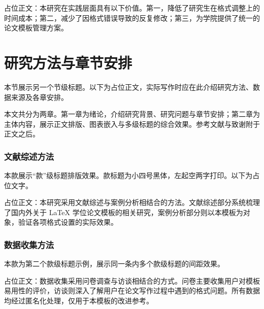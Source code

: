 占位正文：本研究在实践层面具有以下价值。第一，降低了研究生在格式调整上的时间成本；第二，减少了因格式错误导致的反复修改；第三，为学院提供了统一的论文模板管理方案。

\section{研究方法与章节安排}
本节展示另一个节级标题。以下为占位正文，实际写作时应在此介绍研究方法、数据来源及各章安排。

本文共分为两章。第一章为绪论，介绍研究背景、研究问题与章节安排；第二章为主体内容，展示正文排版、图表嵌入与多级标题的综合效果。参考文献与致谢附于正文之后。

\subsubsection{文献综述方法}
本款展示“款”级标题排版效果。款标题为小四号黑体，左起空两字打印。以下为占位文字。

占位正文：本研究采用文献综述与案例分析相结合的方法。文献综述部分系统梳理了国内外关于 \LaTeX{} 学位论文模板的相关研究，案例分析部分则以本模板为对象，验证各项格式设置的实际效果。

\subsubsection{数据收集方法}
本款为第二个款级标题示例，展示同一条内多个款级标题的间距效果。

占位正文：数据收集采用问卷调查与访谈相结合的方式。问卷主要收集用户对模板易用性的评价，访谈则深入了解用户在论文写作过程中遇到的格式问题。所有数据均经过匿名化处理，仅用于本模板的改进参考。
